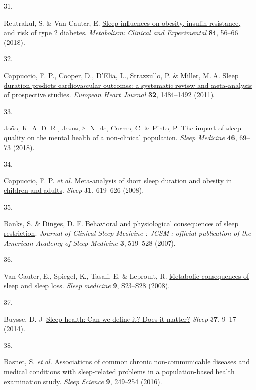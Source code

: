 \documentclass[
  10pt,
]{scrbook}
\newlength{\cslhangindent}
\newlength{\csllabelwidth}
\newlength{\cslentryspacingunit} %
\newenvironment{CSLReferences}[2] %
 {%
  \setlength{\parindent}{0pt}
  \ifodd #1
  \let\oldpar\par
  \def\par{\hangindent=\cslhangindent\oldpar}
  \fi
  \setlength{\parskip}{#2\cslentryspacingunit}
 }%
 {}
\newcommand{\CSLLeftMargin}[1]{\parbox[t]{\csllabelwidth}{#1}}
\newcommand{\CSLRightInline}[1]{\parbox[t]{\linewidth - \csllabelwidth}{#1}\break}
\let\originaltextbf\textbf
\renewcommand{\textbf}[1]{\textcolor{color1}{\textsf{\originaltextbf{#1}}}}
\begin{document}
\begin{CSLReferences}{0}{0}
\leavevmode{}%
\CSLLeftMargin{31. }%
\CSLRightInline{Reutrakul, S. \& Van Cauter, E.
\href{https://doi.org/10.1016/j.metabol.2018.02.010}{Sleep influences on
obesity, insulin resistance, and risk of type 2 diabetes}.
\emph{Metabolism: Clinical and Experimental} \textbf{84}, 56--66
(2018).}

\leavevmode{}%
\CSLLeftMargin{32. }%
\CSLRightInline{Cappuccio, F. P., Cooper, D., D'Elia, L., Strazzullo, P.
\& Miller, M. A. \href{https://doi.org/10.1093/eurheartj/ehr007}{Sleep
duration predicts cardiovascular outcomes: a systematic review and
meta-analysis of prospective studies}. \emph{European Heart Journal}
\textbf{32}, 1484--1492 (2011).}

\leavevmode{}%
\CSLLeftMargin{33. }%
\CSLRightInline{João, K. A. D. R., Jesus, S. N. de, Carmo, C. \& Pinto,
P. \href{https://doi.org/10.1016/j.sleep.2018.02.010}{The impact of
sleep quality on the mental health of a non-clinical population}.
\emph{Sleep Medicine} \textbf{46}, 69--73 (2018).}

\leavevmode{}%
\CSLLeftMargin{34. }%
\CSLRightInline{Cappuccio, F. P. \emph{et al.}
\href{https://doi.org/10.1093/sleep/31.5.619}{Meta-analysis of short
sleep duration and obesity in children and adults}. \emph{Sleep}
\textbf{31}, 619--626 (2008).}

\leavevmode{}%
\CSLLeftMargin{35. }%
\CSLRightInline{Banks, S. \& Dinges, D. F.
\href{https://www.ncbi.nlm.nih.gov/pmc/articles/PMC1978335/}{Behavioral
and physiological consequences of sleep restriction}. \emph{Journal of
Clinical Sleep Medicine : JCSM : official publication of the American
Academy of Sleep Medicine} \textbf{3}, 519--528 (2007).}

\leavevmode{}%
\CSLLeftMargin{36. }%
\CSLRightInline{Van Cauter, E., Spiegel, K., Tasali, E. \& Leproult, R.
\href{https://doi.org/10.1016/S1389-9457(08)70013-3}{Metabolic
consequences of sleep and sleep loss}. \emph{Sleep medicine} \textbf{9},
S23--S28 (2008).}

\leavevmode{}%
\CSLLeftMargin{37. }%
\CSLRightInline{Buysse, D. J.
\href{https://doi.org/10.5665/sleep.3298}{Sleep health: Can we define
it? Does it matter?} \emph{Sleep} \textbf{37}, 9--17 (2014).}

\leavevmode{}%
\CSLLeftMargin{38. }%
\CSLRightInline{Basnet, S. \emph{et al.}
\href{https://doi.org/10.1016/j.slsci.2016.11.003}{Associations of
common chronic non-communicable diseases and medical conditions with
sleep-related problems in a population-based health examination study}.
\emph{Sleep Science} \textbf{9}, 249--254 (2016).}


\end{CSLReferences}
\end{document}
